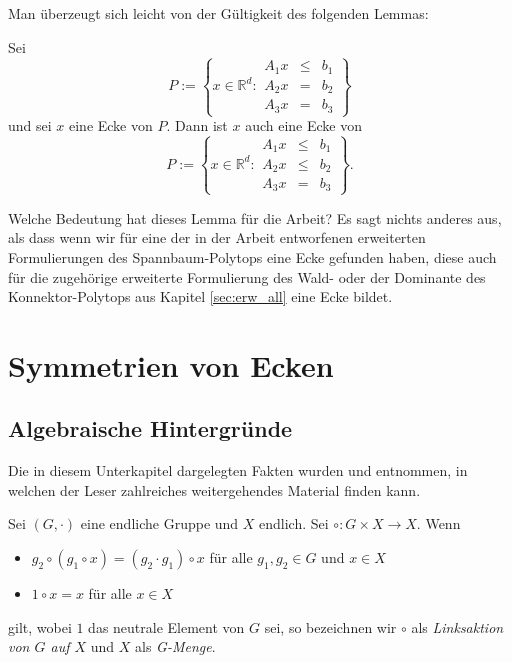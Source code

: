 \documentclass[10p,a4paper,BCOR = 12mm, DIV=15]{scrbook}
\begin{document}
Man überzeugt sich leicht von der Gültigkeit des folgenden Lemmas:
\begin{Le}
Sei
\begin{displaymath}
P := \left\{x \in \mathbb{R}^d: 
\begin{array}{ccc}
A_1 x & \leq & b_1 \\
A_2 x & = & b_2 \\
A_3 x & = & b_3
\end{array}
\right\}
\end{displaymath}
und sei $x$ eine Ecke von $P$. Dann ist $x$ auch eine Ecke von
\begin{displaymath}
P := \left\{x \in \mathbb{R}^d: 
\begin{array}{ccc}
A_1 x & \leq & b_1 \\
A_2 x & \leq & b_2 \\
A_3 x & = & b_3
\end{array}
\right\}.
\end{displaymath}
\end{Le}

Welche Bedeutung hat dieses Lemma für die Arbeit? Es sagt nichts anderes aus, als dass wenn wir für eine der in der Arbeit entworfenen erweiterten Formulierungen des Spannbaum-Polytops eine Ecke gefunden haben, diese auch für die zugehörige erweiterte Formulierung des Wald- oder der Dominante des Konnektor-Polytops aus Kapitel \ref{sec:erw_all} eine Ecke bildet.

\section{Symmetrien von Ecken}

\subsection{Algebraische Hintergründe}

Die in diesem Unterkapitel dargelegten Fakten wurden \cite{bosch2006algebra} und \cite{huppert1998character} entnommen, in welchen der Leser zahlreiches weitergehendes Material finden kann.

\begin{Def}
Sei $\left(G, \cdot\right)$ eine endliche Gruppe und $X$ endlich. Sei $\circ: G \times X \rightarrow X$. Wenn
\begin{itemize}
\item $g_2 \circ \left(g_1 \circ x\right) = \left(g_2 \cdot g_1\right) \circ x$ für alle $g_1, g_2 \in G$ und $x \in X$
\item $1 \circ x = x$ für alle $x \in X$
\end{itemize}
gilt, wobei $1$ das neutrale Element von $G$ sei, so bezeichnen wir $\circ$ als \emph{Linksaktion von $G$ auf $X$} und $X$ als \emph{G-Menge}.
\end{Def}
\end{document}
